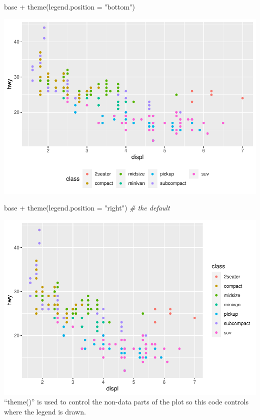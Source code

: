 \documentclass[
]{article}
\newenvironment{Shaded}{\begin{snugshade}}{\end{snugshade}}
\newcommand{\AttributeTok}[1]{\textcolor[rgb]{0.77,0.63,0.00}{#1}}
\newcommand{\CommentTok}[1]{\textcolor[rgb]{0.56,0.35,0.01}{\textit{#1}}}
\newcommand{\FunctionTok}[1]{\textcolor[rgb]{0.00,0.00,0.00}{#1}}
\newcommand{\NormalTok}[1]{#1}
\newcommand{\SpecialCharTok}[1]{\textcolor[rgb]{0.00,0.00,0.00}{#1}}
\newcommand{\StringTok}[1]{\textcolor[rgb]{0.31,0.60,0.02}{#1}}
\begin{document}
\begin{Shaded}
\begin{Highlighting}[]
\NormalTok{base }\SpecialCharTok{+} \FunctionTok{theme}\NormalTok{(}\AttributeTok{legend.position =} \StringTok{"bottom"}\NormalTok{)}
\end{Highlighting}
\end{Shaded}

\includegraphics{Assignments_files/figure-latex/unnamed-chunk-64-3.pdf}

\begin{Shaded}
\begin{Highlighting}[]
\NormalTok{base }\SpecialCharTok{+} \FunctionTok{theme}\NormalTok{(}\AttributeTok{legend.position =} \StringTok{"right"}\NormalTok{) }\CommentTok{\# the default}
\end{Highlighting}
\end{Shaded}

\includegraphics{Assignments_files/figure-latex/unnamed-chunk-64-4.pdf}
``theme()'' is used to control the non-data parts of the plot so this
code controls where the legend is drawn.
\end{document}

